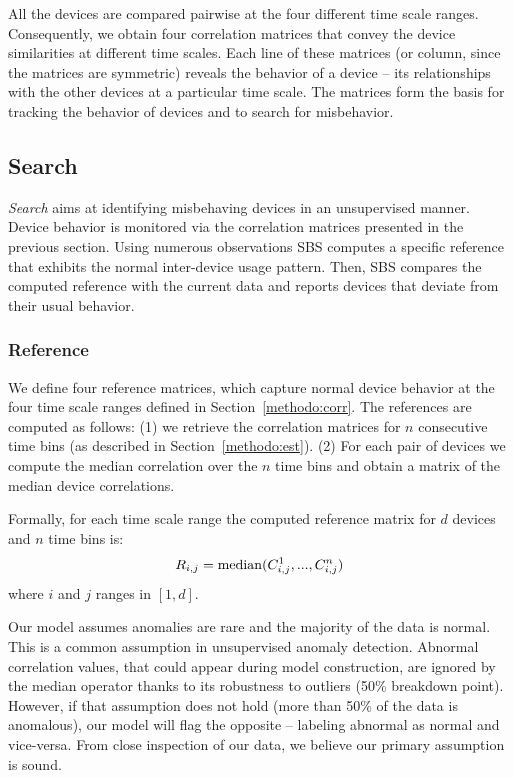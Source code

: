 All the devices are compared pairwise at the four different time scale ranges.
Consequently, we obtain four correlation matrices that convey the device similarities at different time scales.
Each line of these matrices (or column, since the matrices are symmetric) reveals the behavior of a device -- its relationships with the 
other devices at a particular time scale.
The matrices form the basis for tracking the behavior of devices and to search for misbehavior.


\subsection{Search}\label{methodo:ano}
\emph{Search} aims at identifying misbehaving devices in an unsupervised manner.
Device behavior is monitored via the correlation matrices presented in the previous section.
Using numerous observations SBS computes a specific reference that exhibits the normal inter-device usage pattern.
Then, SBS compares the computed reference with the current data and reports devices that deviate from their usual 
behavior.

\subsubsection{Reference}
We define four reference matrices, which capture normal device behavior at the four time scale ranges defined in 
Section~\ref{methodo:corr}.
The references are computed as follows: (1) we retrieve the correlation matrices for $n$ consecutive time bins (as described in Section~\ref{methodo:est}). (2) For each pair of devices we compute the median correlation 
over the $n$ time bins and obtain a matrix of the median device correlations.

Formally, for each time scale range the computed reference matrix for $d$ devices and $n$ time bins is:
\[R_{i,j} =  \operatorname{median}(C^1_{i,j},...,C^n_{i,j})\]
where $i$ and $j$ ranges in $[1,d]$.

Our model assumes anomalies are rare and the majority of the data is normal.
This is a common assumption in unsupervised anomaly detection.
Abnormal correlation values, that could appear during model construction, %
are ignored by the median operator thanks to its robustness to outliers (50\% breakdown point).  
However, if that assumption does not hold (more than 50\% of the data is anomalous), our model will flag the opposite -- labeling abnormal as normal and vice-versa.
From close inspection of our data, we believe our primary assumption is sound.



